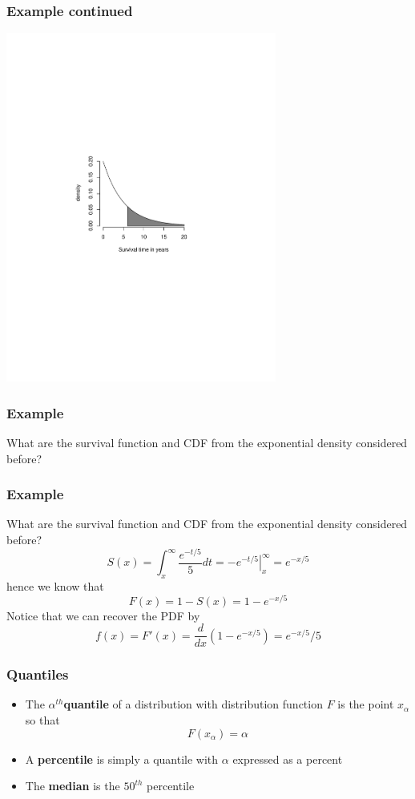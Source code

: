 \documentclass[aspectratio=169]{beamer}
\begin{document}
\begin{frame}
\frametitle{Example continued}
   \includegraphics[width=3.5in]{exponential.pdf}
\end{frame}

\begin{frame}
\frametitle{Example}
What are the survival function and CDF from the exponential density considered before?
\end{frame}

\begin{frame}
\frametitle{Example}
What are the survival function and CDF from the exponential density considered before?
$$
S(x) = \int_x^\infty  \frac{e^{-t/5}}{5}dt =  \left. -e^{-t/5} \right|_{x}^\infty = e^{-x/5}
$$
hence we know that
$$
F(x) = 1 - S(x) = 1 - e^{-x/5}
$$
Notice that we can recover the PDF by
$$
f(x) = F'(x) = \frac{d}{dx} (1 -  e^{-x/5}) = e^{-x/5}/5
$$
\end{frame}


\begin{frame}
\frametitle{Quantiles}
\begin{itemize}
\item The  {\bf $\alpha^{th}$quantile} of a distribution with distribution function 
$F$ is the point $x_\alpha$ so that
$$
F(x_\alpha) = \alpha
$$
\item A {\bf percentile} is simply a quantile with $\alpha$ expressed as a percent
\item The {\bf median} is the $50^{th}$ percentile
\end{itemize}
\end{frame}
\end{document}
